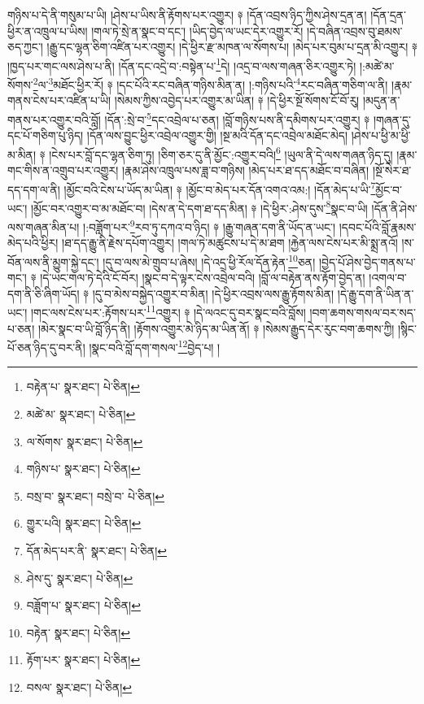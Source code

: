 གཉིས་པ་དེ་ནི་གསུམ་པ་ཡི། །ཤེས་པ་ཡིས་ནི་རྟོགས་པར་འགྱུར། ༈ །དོན་འབྲས་ཉིད་ཀྱིས་ཤེས་དྲན་ན། །དོན་དྲན་ཕྱིར་ན་འཁྲུལ་པ་ཡིས། །གལ་ཏེ་སྲེ་ན་སྣང་བ་དང་། །ཡིད་བྱེད་ལ་ཡང་དེར་འགྱུར་རོ། །དེ་བཞིན་འབྲས་བུ་ཐམས་ཅད་ཀྱང་། །རྒྱུ་དང་ལྷན་ཅིག་འཛིན་པར་འགྱུར། །དེ་ཕྱིར་རྫ་མཁན་ལ་སོགས་པ། །མེད་པར་བུམ་པ་དྲན་མི་འགྱུར། ༈ །ཁྱད་པར་གང་ལས་ཤེས་པ་ནི། །དོན་དང་འདྲེ་བ་:བསྟེན་པ་\footnote{བརྟེན་པ་  སྣར་ཐང་།  པེ་ཅིན། }དེ། །འདྲ་བ་ལས་གཞན་ཅིར་འགྱུར་ཏེ། །:མཚེ་མ་སོགས་\footnote{མཚེ་མ་  སྣར་ཐང་།  པེ་ཅིན། }ལ་\footnote{ལ་སོགས་  སྣར་ཐང་།  པེ་ཅིན། }མཐོང་ཕྱིར་རོ། ༈ །དང་པོའི་རང་བཞིན་གཉིས་མིན་ན། །:གཉིས་པའི་\footnote{གཉིས་པ་  སྣར་ཐང་།  པེ་ཅིན། }རང་བཞིན་གཅིག་ལ་ནི། །རྣམ་གནས་ངེས་པར་འཛིན་པ་ཡི། །སེམས་ཀྱིས་འབྱེད་པར་འགྱུར་མ་ཡིན། ༈ །དེ་ཕྱིར་སྔོ་སོགས་ངོ་བོ་རུ། །མདུན་ན་གནས་པར་འགྱུར་བའི་བློ། །དོན་:སྲེ་བ་\footnote{བསྲ་བ་  སྣར་ཐང་། བསྲེ་བ་  པེ་ཅིན། }དང་འབྲེལ་པ་ཅན། །བློ་གཉིས་པས་ནི་དམིགས་པར་འགྱུར། ༈ །གཞན་དུ་དང་པོ་གཅིག་པུ་ཉིད། །དོན་ལས་བྱུང་ཕྱིར་འབྲེལ་འགྱུར་གྱི། །སྔ་མའི་དོན་དང་འབྲེལ་མཐོང་མེད། །ཤེས་པ་ཕྱི་མ་ཕྱི་མ་མིན། ༈ །ངེས་པར་བློ་དང་ལྷན་ཅིག་ཏུ། །ཅིག་ཅར་དུ་ནི་མྱོང་:འགྱུར་བའི།\footnote{གྱུར་པའི།  སྣར་ཐང་།  པེ་ཅིན། } །ཡུལ་ནི་དེ་ལས་གཞན་ཉིད་དུ། །རྣམ་གང་གིས་ན་འགྲུབ་པར་འགྱུར། །རྣམ་ཤེས་འཁྲུལ་པས་ཟླ་བ་གཉིས། །མེད་པར་ཐ་དད་མཐོང་བ་བཞིན། །སྔོ་སེར་ཐ་དད་དག་ལ་ནི། །མྱོང་བའི་ངེས་པ་ཡོད་མ་ཡིན། ༈ །མྱོང་བ་མེད་པར་དོན་འགའ་འམ:། །དོན་མེད་པ་ཡི་\footnote{དོན་མེད་པར་ནི་  སྣར་ཐང་།  པེ་ཅིན། }མྱོང་བ་ཡང་། །མྱོང་བར་འགྱུར་བ་མ་མཐོང་བ། །དེས་ན་དེ་དག་ཐ་དད་མིན། ༈ །དེ་ཕྱིར་:ཤེས་དུས་\footnote{ཤེས་དུ་  སྣར་ཐང་།  པེ་ཅིན། }སྣང་བ་ཡི། །དོན་ནི་ཤེས་ལས་གཞན་མིན་པ། །:བཟློག་པར་\footnote{བཟློག་པ་  སྣར་ཐང་།  པེ་ཅིན། }རབ་ཏུ་དཀའ་བ་ཉིད། ༈ །རྒྱུ་གཞན་དག་ནི་ཡོད་ན་ཡང་། །དབང་པོའི་བློ་རྣམས་མེད་པའི་ཕྱིར། །ཐ་དད་རྒྱུ་ནི་རྗེས་དཔོག་འགྱུར། །གལ་ཏེ་མཚུངས་པ་དེ་མ་ཐག །རྐྱེན་ལས་ངེས་པར་མི་སྨྲ་ནའོ། །ས་བོན་ལས་ནི་མྱུག་སྐྱེ་དང་། །དུ་བ་ལས་མེ་གྲུབ་པ་ཞེས། །དེ་འདྲ་ཕྱི་རོལ་དོན་རྟེན་\footnote{བརྟེན་  སྣར་ཐང་།  པེ་ཅིན། }ཅན། །བྱེད་པོ་ཤེས་བྱེད་གནས་པ་གང་། ༈ །དེ་ཡང་གལ་ཏེ་དེའི་ངོ་བོར། །སྣང་བ་དེ་ལྟར་ངེས་འབྲེལ་བའི། །བློ་ལ་བརྟེན་ནས་རྟོག་བྱེད་ན། །འགལ་བ་དག་ནི་ཅི་ཞིག་ཡོད། ༈ །དུ་བ་མེས་བསྐྱེད་འགྱུར་བ་མིན། །དེ་ཕྱིར་འབྲས་ལས་རྒྱུ་རྟོགས་མིན། །དེ་རྒྱུ་དག་ནི་ཡིན་ན་ཡང་། །གང་ལས་ངེས་པར་:རྟོགས་པར་\footnote{རྟོག་པར་  སྣར་ཐང་།  པེ་ཅིན། }འགྱུར། ༈ །དེ་ལའང་དུ་བར་སྣང་བའི་བློས། །བག་ཆགས་གསལ་བར་སད་པ་ཅན། །མེར་སྣང་བ་ཡི་བློ་ཉིད་ནི། །རྟོགས་འགྱུར་མེ་ཉིད་མ་ཡིན་ནོ། ༈ །སེམས་རྒྱུད་དེར་རུང་བག་ཆགས་ཀྱི། །སྙིང་པོ་ཅན་ཉིད་དུ་བར་ནི། །སྣང་བའི་བློ་དག་གསལ་\footnote{བསལ་  སྣར་ཐང་།  པེ་ཅིན། }བྱེད་པ། །
